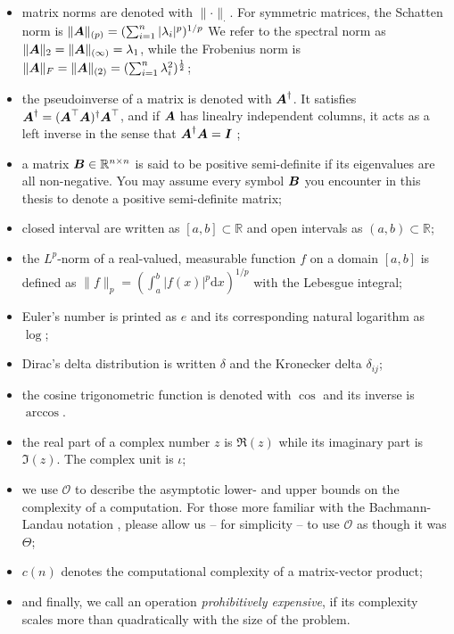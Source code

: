 \begin{itemize}
    \item matrix norms are denoted with $\lVert \cdot \rVert _{\cdot}$.
          For symmetric matrices, the Schatten norm is
          $\lVert \boldsymbol{A} \rVert _{(p)} = (\sum_{i=1}^n |\lambda_i|^p)^{1/p}$
          We refer to the spectral norm as
          $\lVert \boldsymbol{A} \rVert _2 = \lVert \boldsymbol{A} \rVert _{(\infty)} = \lambda_1$, while the Frobenius norm
          is $\lVert \boldsymbol{A} \rVert _F = \lVert \boldsymbol{A} \rVert _{(2)} = (\sum_{i=1}^{n} \lambda_i^2)^{\frac{1}{2}}$;
    \item the pseudoinverse of a matrix is denoted with $\boldsymbol{A}^{\dagger}$. It
          satisfies $\boldsymbol{A}^{\dagger}=(\boldsymbol{A}^{\top} \boldsymbol{A})^{\dagger} \boldsymbol{A}^{\top}$,
          and if $\boldsymbol{A}$ has linealry independent columns, it acts as a left inverse
          in the sense that $\boldsymbol{A}^{\dagger} \boldsymbol{A} = \boldsymbol{I}$ \cite{penrose1955pseudo};
    \item a matrix $\boldsymbol{B} \in \mathbb{R}^{n \times n}$ is said to be positive
          semi-definite if its eigenvalues are all non-negative. You may assume every
          symbol $\boldsymbol{B}$ you encounter in this thesis to denote a positive
          semi-definite matrix;
    \item closed interval are written as $[a, b] \subset \mathbb{R}$ and open
          intervals as $(a, b) \subset \mathbb{R}$;
    \item the $L^p$-norm of a real-valued, measurable function $f$ on a
          domain $[a, b]$ is defined as
          $\lVert f \rVert _{p} = (\int_{a}^{b} |f(x)|^p \mathrm{d}x)^{1/p}$ with the Lebesgue integral;
    \item Euler's number is printed as $e$ and its corresponding natural logarithm as $\log$;
    \item Dirac's delta distribution is written $\delta$ \cite[chapter~15]{dirac1947quantum}
          and the Kronecker delta $\delta_{ij}$;
    \item the cosine trigonometric function is denoted with $\cos$ and its inverse is $\arccos$.
    \item the real part of a complex number $z$ is $\Re(z)$ while its imaginary part is $\Im(z)$.
          The complex unit is $\iota$;
    \item we use $\mathcal{O}$ to describe the asymptotic lower- and upper bounds
          on the complexity of a computation. For those more familiar with the
          Bachmann-Landau notation \cite[section~3.2]{cormen2009algorithms},
          please allow us -- for simplicity -- to use $\mathcal{O}$ as though it was $\Theta$;
    \item $c(n)$ denotes the computational complexity of a matrix-vector product;
    \item and finally, we call an operation \emph{prohibitively expensive}, if its
          complexity scales more than quadratically with the size of the problem.
\end{itemize}
